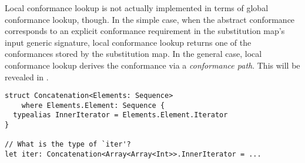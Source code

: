 \documentclass[../generics]{subfiles}
\begin{document}
Local conformance lookup is not actually implemented in terms of global conformance lookup, though. In the simple case, when the abstract conformance corresponds to an explicit conformance requirement in the substitution map's input generic signature,  local conformance lookup returns one of the conformances stored by the substitution map. In the general case, local conformance lookup derives the conformance via a \emph{conformance path}. This will be revealed in .

\begin{listing}\label{dmt subst map listing}
\begin{Verbatim}
struct Concatenation<Elements: Sequence>
    where Elements.Element: Sequence {
  typealias InnerIterator = Elements.Element.Iterator
}

// What is the type of `iter'?
let iter: Concatenation<Array<Array<Int>>.InnerIterator = ...
\end{Verbatim}
\end{listing}
\end{document}
